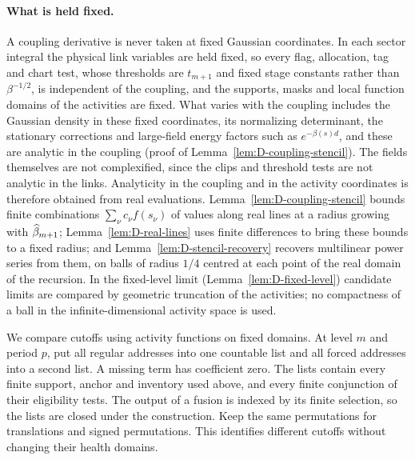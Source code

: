 \paragraph{What is held fixed.} A coupling derivative is never taken at fixed Gaussian coordinates. In each sector integral the physical link variables are held fixed, so every flag, allocation, tag and chart test, whose thresholds are $t_{m+1}$ and fixed stage constants rather than $\beta^{-1/2}$, is independent of the coupling, and the supports, masks and local function domains of the activities are fixed. What varies with the coupling includes the Gaussian density in these fixed coordinates, its normalizing determinant, the stationary corrections and large-field energy factors such as $e^{-\beta(s)d}$, and these are analytic in the coupling (proof of Lemma~\ref{lem:D-coupling-stencil}). The fields themselves are not complexified, since the clips and threshold tests are not analytic in the links. Analyticity in the coupling and in the activity coordinates is therefore obtained from real evaluations. Lemma~\ref{lem:D-coupling-stencil} bounds finite combinations $\sum_\nu c_\nu f(s_\nu)$ of values along real lines at a radius growing with $\widehat{\beta}_{m+1}$; Lemma~\ref{lem:D-real-lines} uses finite differences to bring these bounds to a fixed radius; and Lemma~\ref{lem:D-stencil-recovery} recovers multilinear power series from them, on balls of radius $1/4$ centred at each point of the real domain of the recursion. In the fixed-level limit (Lemma~\ref{lem:D-fixed-level}) candidate limits are compared by geometric truncation of the activities; no compactness of a ball in the infinite-dimensional activity space is used.

We compare cutoffs using activity functions on fixed domains. At level $m$ and period $p$, put all regular addresses into one countable list and all forced addresses into a second list. A missing term has coefficient zero. The lists contain every finite support, anchor and inventory used above, and every finite conjunction of their eligibility tests. The output of a fusion is indexed by its finite selection, so the lists are closed under the construction. Keep the same permutations for translations and signed permutations. This identifies different cutoffs without changing their health domains.

